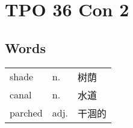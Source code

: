 \section{TPO 36 Con 2}

\subsection{Words}

\begin{tabular}{lll}
    shade   & n.   & 树荫  \\
    canal   & n.   & 水道  \\
    parched & adj. & 干涸的 \\
\end{tabular}
